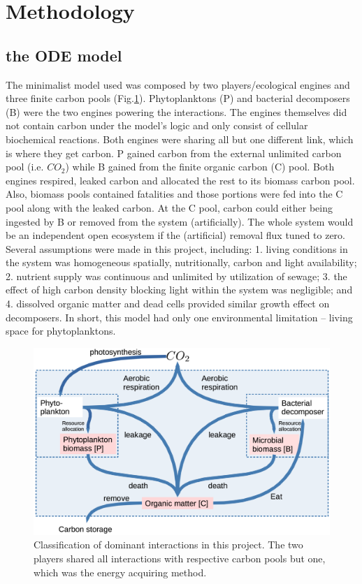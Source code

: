 \documentclass[../thesis.tex]{subfiles} %
\begin{document}
\section{Methodology}

\subsection{the ODE model}
The minimalist model used was composed by two players/ecological engines and three finite carbon pools (Fig.\ref{modelInWord}).  Phytoplanktons (P) and bacterial decomposers (B) were the two engines powering the interactions.  The engines themselves did not contain carbon under the model's logic and only consist of cellular biochemical reactions.  Both engines were sharing all but one different link, which is where they get carbon.  P gained carbon from the external unlimited carbon pool (i.e. $CO_2$) while B gained from the finite organic carbon (C) pool.  Both engines respired, leaked carbon and allocated the rest to its biomass carbon pool.  Also, biomass pools contained fatalities and those portions were fed into the C pool along with the leaked carbon.  At the C pool, carbon could either being ingested by B or removed from the system (artificially).  The whole system would be an independent open ecosystem if the (artificial) removal flux tuned to zero.  Several assumptions were made in this project, including: 1. living conditions in the system was homogeneous spatially, nutritionally, carbon and light availability; 2. nutrient supply was continuous and unlimited by utilization of sewage;\autocite{markou2014microalgal} 3. the effect of high carbon density blocking light within the system was negligible; and 4. dissolved organic matter and dead cells provided similar growth effect on decomposers.  In short, this model had only one environmental limitation -- living space for phytoplanktons.

\begin{figure}[H]
    \centering
    \includegraphics[width=.8\linewidth]{media/model.png}
    \caption[Model visualization]{Classification of dominant interactions in this project.  The two players shared all interactions with respective carbon pools but one, which was the energy acquiring method.}
    \label{modelInWord}
\end{figure}
\end{document}

